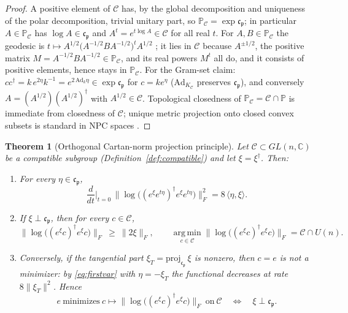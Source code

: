 \documentclass[11pt]{article}
\newtheorem{theorem}{Theorem}[section]
\theoremstyle{definition}
\theoremstyle{remark}
\newcommand{\C}{\mathbb{C}}
\newcommand{\dg}{\dagger}
\begin{document}
\begin{proof}
A positive element of $\mathcal C$ has, by the global decomposition and
uniqueness of the polar decomposition, trivial unitary part, so
$\mathbb P_{\mathcal C}=\exp\mathfrak c_{\mathfrak p}$; in particular
$A\in\mathbb P_{\mathcal C}$ has $\log A\in\mathfrak c_{\mathfrak p}$ and
$A^{t}=e^{t\log A}\in\mathcal C$ for all real $t$.  For
$A,B\in\mathbb P_{\mathcal C}$ the geodesic is
$t\mapsto A^{1/2}\big(A^{-1/2}BA^{-1/2}\big)^{t}A^{1/2}$
\cite{Bhatia2007}; it lies in $\mathcal C$ because $A^{\pm1/2}$, the
positive matrix $M=A^{-1/2}BA^{-1/2}\in\mathbb P_{\mathcal C}$, and its
real powers $M^{t}$ all do, and it consists of positive elements, hence
stays in $\mathbb P_{\mathcal C}$.  For the Gram-set claim:
$cc^{\dg}=k\,e^{2\eta}k^{-1}=e^{2\,\mathrm{Ad}_k\eta}
\in\exp\mathfrak c_{\mathfrak p}$ for $c=k e^{\eta}$
($\mathrm{Ad}_{K_{\mathcal C}}$ preserves $\mathfrak c_{\mathfrak p}$),
and conversely $A=(A^{1/2})(A^{1/2})^{\dg}$ with
$A^{1/2}\in\mathcal C$.  Topological closedness of
$\mathbb P_{\mathcal C}=\mathcal C\cap\mathbb P$ is immediate from
closedness of $\mathcal C$; unique metric projection onto closed convex
subsets is standard in NPC spaces \cite{BridsonHaefliger}.
\end{proof}

\begin{theorem}[Orthogonal Cartan-norm projection principle]
\label{thm:projection}
Let $\mathcal C\subset GL(n,\C)$ be a compatible subgroup
(Definition~\ref{def:compatible}) and let $\xi=\xi^{\dg}$.  Then:
\begin{enumerate}
\item[(a)] For every $\eta\in\mathfrak c_{\mathfrak p}$,
\begin{equation}\label{eq:firstvar}
\frac{d}{dt}\Big|_{t=0}\,
\big\|\log\big((e^{\xi}e^{t\eta})^{\dg}e^{\xi}e^{t\eta}\big)\big\|_F^2
=8\,\langle\eta,\xi\rangle .
\end{equation}
\item[(b)] If $\xi\perp\mathfrak c_{\mathfrak p}$, then for every
$c\in\mathcal C$,
\begin{equation}
\big\|\log\big((e^{\xi}c)^{\dg}e^{\xi}c\big)\big\|_F\ \ge\ \|2\xi\|_F,
\qquad
\operatorname*{arg\,min}_{c\in\mathcal C}
\big\|\log\big((e^{\xi}c)^{\dg}e^{\xi}c\big)\big\|_F
=\mathcal C\cap U(n) .
\end{equation}
\item[(c)] Conversely, if the tangential part
$\xi_T=\mathrm{proj}_{\mathfrak c_{\mathfrak p}}\,\xi$ is nonzero, then
$c=e$ is not a minimizer: by \eqref{eq:firstvar} with $\eta=-\xi_T$ the
functional decreases at rate $8\|\xi_T\|^2$.  Hence
\begin{equation}
e\ \text{minimizes}\ c\mapsto
\big\|\log\big((e^{\xi}c)^{\dg}e^{\xi}c\big)\big\|_F
\ \text{on}\ \mathcal C
\quad\Longleftrightarrow\quad
\xi\perp\mathfrak c_{\mathfrak p} .
\end{equation}
\end{enumerate}
\end{theorem}
\end{document}
